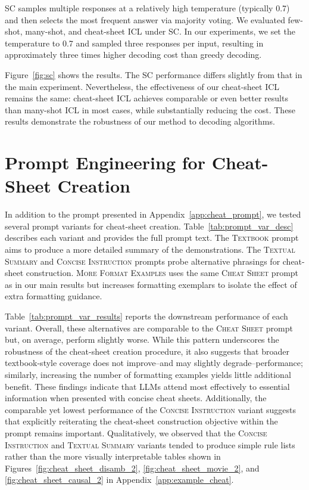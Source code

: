 \documentclass[11pt]{article}
\begin{document}
SC samples multiple responses at a relatively high temperature (typically 0.7) and then selects the most frequent answer via majority voting.
We evaluated few-shot, many-shot, and cheat-sheet ICL under SC.
In our experiments, we set the temperature to 0.7 and sampled three responses per input, resulting in approximately three times higher decoding cost than greedy decoding.

Figure~\ref{fig:sc} shows the results.
The SC performance differs slightly from that in the main experiment.
Nevertheless, the effectiveness of our cheat-sheet ICL remains the same: cheat-sheet ICL achieves comparable or even better results than many-shot ICL in most cases, while substantially reducing the cost.
These results demonstrate the robustness of our method to decoding algorithms.


\section{Prompt Engineering for Cheat-Sheet Creation}
\label{app:expt_prompt}
In addition to the prompt presented in Appendix~\ref{app:cheat_prompt}, we tested several prompt variants for cheat-sheet creation.
Table~\ref{tab:prompt_var_desc} describes each variant and provides the full prompt text.
The \textsc{Textbook} prompt aims to produce a more detailed summary of the demonstrations.
The \textsc{Textual Summary} and \textsc{Concise Instruction} prompts probe alternative phrasings for cheat-sheet construction.
\textsc{More Format Examples} uses the same \textsc{Cheat Sheet} prompt as in our main results but increases formatting exemplars to isolate the effect of extra formatting guidance.

Table~\ref{tab:prompt_var_results} reports the downstream performance of each variant.
Overall, these alternatives are comparable to the \textsc{Cheat Sheet} prompt but, on average, perform slightly worse.
While this pattern underscores the robustness of the cheat-sheet creation procedure, it also suggests that broader textbook-style coverage does not improve--and may slightly degrade--performance; similarly, increasing the number of formatting examples yields little additional benefit.
These findings indicate that LLMs attend most effectively to essential information when presented with concise cheat sheets.
Additionally, the comparable yet lowest performance of the \textsc{Concise Instruction} variant suggests that explicitly reiterating the cheat-sheet construction objective within the prompt remains important.
Qualitatively, we observed that the \textsc{Concise Instruction} and \textsc{Textual Summary} variants tended to produce simple rule lists rather than the more visually interpretable tables shown in Figures~\ref{fig:cheat_sheet_disamb_2}, \ref{fig:cheat_sheet_movie_2}, and \ref{fig:cheat_sheet_causal_2} in Appendix~\ref{app:example_cheat}.
\end{document}

